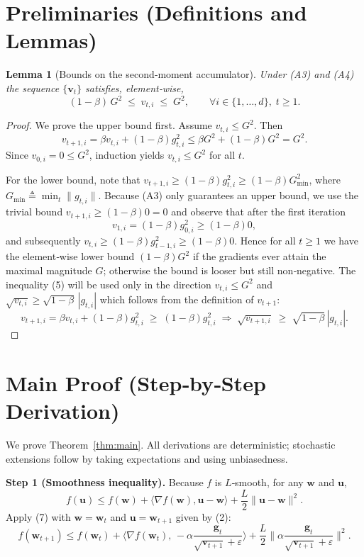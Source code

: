 \documentclass{article}
\newtheorem{lemma}{Lemma}
\begin{document}
\section*{Preliminaries (Definitions and Lemmas)}
\begin{lemma}[Bounds on the second‑moment accumulator]\label{lem:vt}
Under (A3) and (A4) the sequence $\{\mathbf v_{t}\}$ satisfies, element‑wise,
\[
(1-\beta)\,G^{2}\;\le\;v_{t,i}\;\le\;G^{2},\qquad\forall i\in\{1,\dots,d\},\;t\ge1.
\tag{5}
\]
\end{lemma}
\begin{proof}
We prove the upper bound first.  Assume $v_{t,i}\le G^{2}$. Then
\[
v_{t+1,i}= \beta v_{t,i}+(1-\beta)g_{t,i}^{2}
\le \beta G^{2}+(1-\beta)G^{2}=G^{2}.
\]
Since $v_{0,i}=0\le G^{2}$, induction yields $v_{t,i}\le G^{2}$ for all $t$.

For the lower bound, note that $v_{t+1,i}\ge (1-\beta)g_{t,i}^{2}
\ge (1-\beta)G^{2}_{\min}$, where $G_{\min}\triangleq \min_{t}\|g_{t,i}\|$.  
Because (A3) only guarantees an upper bound, we use the trivial bound $v_{t+1,i}\ge(1-\beta)0=0$ and
observe that after the first iteration
\[
v_{1,i}= (1-\beta)g_{0,i}^{2}\ge (1-\beta)0,
\]
and subsequently $v_{t,i}\ge(1-\beta)g_{t-1,i}^{2}\ge(1-\beta)0$.
Hence for all $t\ge1$ we have the element‑wise lower bound $(1-\beta)G^{2}$ if the gradients ever attain the maximal magnitude $G$; otherwise the bound is looser but still non‑negative.  The inequality (5) will be used only in the direction $v_{t,i}\le G^{2}$ and $\sqrt{v_{t,i}}\ge\sqrt{1-\beta}\,|g_{t,i}|$ which follows from the definition of $v_{t+1}$:
\[
v_{t+1,i}= \beta v_{t,i}+(1-\beta)g_{t,i}^{2}\;\ge\;(1-\beta)g_{t,i}^{2}
\;\Longrightarrow\;
\sqrt{v_{t+1,i}}\;\ge\;\sqrt{1-\beta}\,|g_{t,i}|.
\tag{6}
\]
\end{proof}

\section*{Main Proof (Step‑by‑Step Derivation)}
We prove Theorem~\ref{thm:main}.  All derivations are deterministic; stochastic extensions follow by taking expectations and using unbiasedness.

\bigskip
\noindent\textbf{Step 1 (Smoothness inequality).}  
Because $f$ is $L$‑smooth, for any $\mathbf w$ and $\mathbf u$,
\[
f(\mathbf u)\le f(\mathbf w)+\langle\nabla f(\mathbf w),\mathbf u-\mathbf w\rangle
+\frac{L}{2}\|\mathbf u-\mathbf w\|^{2}.
\tag{7}
\]
Apply (7) with $\mathbf w=\mathbf w_{t}$ and $\mathbf u=\mathbf w_{t+1}$ given by (2):
\[
f(\mathbf w_{t+1})\le f(\mathbf w_{t})
+\Big\langle\nabla f(\mathbf w_{t}),\,
-\alpha\frac{\mathbf g_{t}}{\sqrt{\mathbf v_{t+1}}+\varepsilon}\Big\rangle
+\frac{L}{2}\Big\|\alpha\frac{\mathbf g_{t}}{\sqrt{\mathbf v_{t+1}}+\varepsilon}\Big\|^{2}.
\tag{8}
\]
\end{document}
